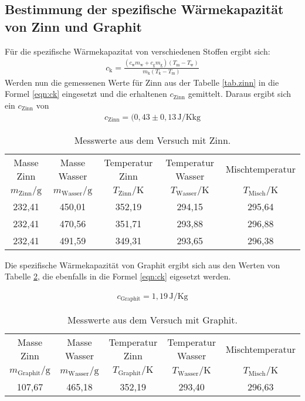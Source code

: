 \subsection{Bestimmung der spezifische Wärmekapazität von Zinn und Graphit}
Für die spezifische Wärmekapazitat von verschiedenen Stoffen ergibt sich:
\begin{align}
c_\mathrm{k}=\frac{(c_\mathrm{w} m_\mathrm{w}+c_\mathrm{g} m_\mathrm{g})(T_\mathrm{m}-T_\mathrm{w})}{m_\mathrm{k}(T_\mathrm{k}-T_\mathrm{m})}\label{eqn:ck}
\end{align}
Werden nun die gemessenen Werte für Zinn aus der Tabelle \ref{tab.zinn} in die Formel \eqref{eqn:ck} eingesetzt und die erhaltenen $c_{\mathrm{Zinn}}$ gemittelt.
Daraus ergibt sich ein $c_{\mathrm{Zinn}}$ von
\begin{align*}
c_\mathrm{Zinn} =  (0,43\pm0,13 \,\si{\joule\per\kelvin\kilo\gram}
\end{align*}
\begin{table}
  \centering
  \caption{Messwerte aus dem Versuch mit Zinn.}
  \label{tab:zinn}
   \begin{tabular}{c c c c c}
\toprule
Masse Zinn & Masse Wasser & Temperatur Zinn & Temperatur Wasser  & Mischtemperatur \\
$m_\mathrm{Zinn}/\si{\gram}$ & $m_\mathrm{Wasser}/\si{\gram}$ & $T_\mathrm{Zinn}/\si{\kelvin}$ & $T_\mathrm{Wasser}/\si{\kelvin}$ & $T_\mathrm{Misch}/\si{\kelvin}$ \\
\midrule
     232,41 &   450,01 &  352,19 &   294,15  &   295,64 \\
     232,41 &   470,56 &  351,71 &   293,88  &   296,88 \\
     232,41 &   491,59 &  349,31 &   293,65  &   296,38 \\
\bottomrule
\end{tabular}
\end{table}

Die spezifische Wärmekapazität von Graphit ergibt sich aus den Werten von Tabelle \ref{tab:graphit},
die ebenfalls in die Formel \eqref{eqn:ck} eigesetzt werden.

\begin{align*}
c_\mathrm{Graphit} = 1,19 \,\si{\joule\per\kelvin\gram}
\end{align*}
\begin{table}
  \centering
  \caption{Messwerte aus dem Versuch mit Graphit.}
  \label{tab:graphit}
   \begin{tabular}{c c c c c}
\toprule
Masse Zinn & Masse Wasser & Temperatur Zinn & Temperatur Wasser  & Mischtemperatur \\
$m_\mathrm{Graphit}/\si{\gram}$ & $m_\mathrm{Wasser}/\si{\gram}$ & $T_\mathrm{Graphit}/\si{\kelvin}$ & $T_\mathrm{Wasser}/\si{\kelvin}$ & $T_\mathrm{Misch}/\si{\kelvin}$ \\
\midrule
107,67 & 465,18 & 352,19 & 293,40 & 296,63 \\
\bottomrule
\end{tabular}
\end{table}




